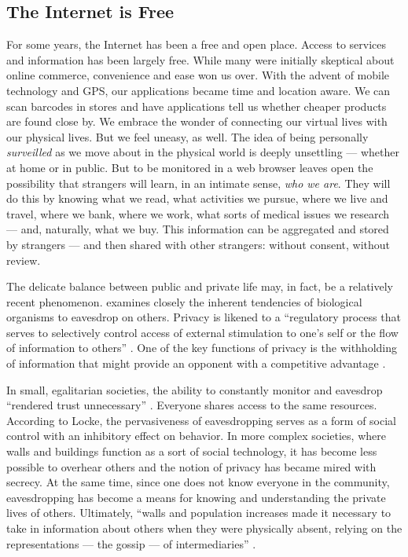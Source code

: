 \subsection{The Internet is Free}
\label{theinternetisfree}

For some years, the Internet has been a free and open place. Access to services and information has been largely free. While many were initially skeptical about online commerce, convenience and ease won us over. With the advent of mobile technology and GPS, our applications became time and location aware. We can scan barcodes in stores and have applications tell us whether cheaper products are found close by. We embrace the wonder of connecting our virtual lives with our physical lives. But we feel uneasy, as well. The idea of being personally \emph{surveilled} as we move about in the physical world is deeply unsettling --- whether at home or in public. But to be monitored in a web browser leaves open the possibility that strangers will learn, in an intimate sense, \emph{who we are}. They will do this by knowing what we read, what activities we pursue, where we live and travel, where we bank, where we work, what sorts of medical issues we research --- and, naturally, what we buy. This information can be aggregated and stored by strangers --- and then shared with other strangers: without consent, without review.

The delicate balance between public and private life may, in fact, be a relatively recent phenomenon.  \cite{Locke:2010wt}  examines closely the inherent tendencies of biological organisms to eavesdrop on others. Privacy is likened to a ``regulatory process that serves to selectively control access of external stimulation to one's self or the flow of information to others''  \citep[p. 53]{Klopfer:1977ch}.  One of the key functions of privacy is the withholding of information that might provide an opponent with a competitive advantage  \citep{Klopfer:1977ch}.  

In small, egalitarian societies, the ability to constantly monitor and eavesdrop ``rendered trust unnecessary''  \citep[p. 74]{Locke:2010wt}.  Everyone shares access to the same resources. According to Locke, the pervasiveness of eavesdropping serves as a form of social control with an inhibitory effect on behavior. In more complex societies, where walls and buildings function as a sort of social technology, it has become less possible to overhear others and the notion of privacy has became mired with secrecy. At the same time, since one does not know everyone in the community, eavesdropping has become a means for knowing and understanding the private lives of others. Ultimately, ``walls and population increases made it necessary to take in information about others when they were physically absent, relying on the representations --- the gossip --- of intermediaries''  \citep[p. 192]{Locke:2010wt}.  


